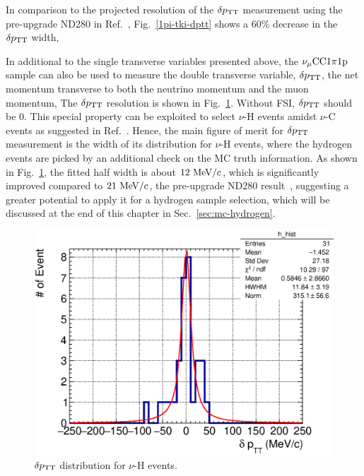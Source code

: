      In comparison to the projected resolution of the $\delta p_\textrm{TT}$ measurement using the pre-upgrade ND280 in Ref.~\cite{lu:2015hea}, Fig.~\ref{1pi-tki-dptt} shows a $60\%$ decrease in the $\delta p_\textrm{TT}$ width, 

     In additional to the single transverse variables presented above, the $\nu_{\mu}\textrm{CC}1\pi1\textrm{p}$ sample can also be used to measure the double transverse variable, $\delta p_\textrm{TT}$, the net momentum transverse to both the neutrino momentum and the muon momentum,
     The $\delta p_\textrm{TT}$ resolution is shown in Fig.~\ref{fig:1pi-tki-dptt}.
     Without FSI, $\delta p_\textrm{TT}$ should be $0$. This special property can be exploited to select $\nu$-H events amidst $\nu$-C events as suggested in Ref.~\cite{dpttpaper}. 
     Hence, the main figure of merit for $\delta p_\textrm{TT}$ measurement is the width of its distribution for $\nu$-H events, where the hydrogen events are picked by an additional check on the MC truth information.
     As shown in Fig.~\ref{fig:1pi-tki-dptt}, the fitted half width is about $12~\textrm{MeV}/c$, which is significantly improved compared to $21~\textrm{MeV}/c$, the pre-upgrade ND280 result~\cite{lu:2015hea}, suggesting a greater potential to apply it for a hydrogen sample selection, which will be discussed at the end of this chapter in Sec.~\ref{sec:mc-hydrogen}.

     \begin{figure}[!htb] 
          \centering 		
          \includegraphics[width=\sgfigwid\textwidth]{figures/perf/tki/SFGpTPCmu_dptt_hist_al15_H_bin100_range500_Lfit.eps}
          \caption{\label{fig:1pi-tki-dptt} $\delta p_\textrm{TT}$ distribution for $\nu$-H events.} 
     \end{figure}


